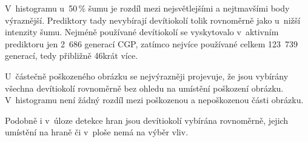 V~histogramu u~50\,\% šumu je rozdíl mezi nejsvětlejšími a nejtmavšími body výraznější. Prediktory tady nevybírají devítiokolí tolik rovnoměrně jako u~nižší intenzity šumu. Nejméně používané devítiokolí se vyskytovalo v~aktivním prediktoru jen 2~686 generací CGP, zatímco nejvíce používané celkem 123~739 generací, tedy přibližně 46krát více. %

U~částečně poškozeného obrázku se nejvýrazněji projevuje, že jsou vybírány všechna devítiokolí rovnoměrně bez ohledu na umístění poškození obrázku. V~histogramu není žádný rozdíl mezi poškozenou a nepoškozenou části obrázku.

Podobně i v~úloze detekce hran jsou devítiokolí vybírána rovnoměrně, jejich umístění na hraně či v~ploše nemá na výběr vliv.

